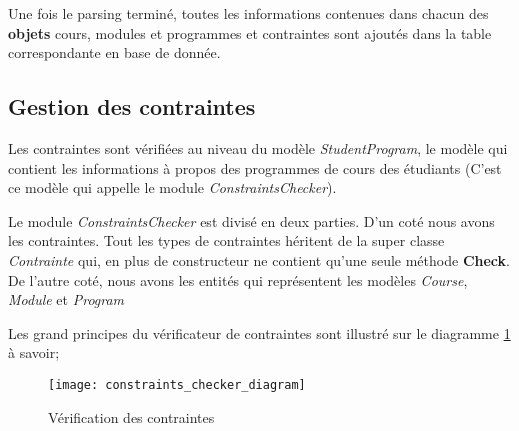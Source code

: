 

Une fois le parsing terminé, toutes les informations contenues dans chacun des \textbf{objets} cours, modules et programmes et contraintes sont ajoutés dans la table correspondante en base de donnée. 


\subsection{Gestion des contraintes}
\label{constraint_mgmt}
Les contraintes sont vérifiées au niveau du modèle \textit{StudentProgram}, le modèle qui contient les informations à propos des programmes de cours des étudiants (C'est ce modèle qui appelle le module \textit{ConstraintsChecker}). 

Le module \textit{ConstraintsChecker} est divisé en deux parties. D'un coté nous avons les contraintes. Tout les types de contraintes héritent de la super classe \textit{Contrainte} qui, en plus de constructeur ne contient qu'une seule méthode \textbf{Check}. De l'autre coté, nous avons les entités qui représentent les modèles \textit{Course}, \textit{Module} et \textit{Program}

Les grand principes du vérificateur de contraintes sont illustré sur le diagramme \ref{fig:constraint_checker_diagram} à savoir;

\begin{figure}
\centering
\caption{Vérification des contraintes}
\label{fig:constraint_checker_diagram}
\texttt{[image: constraints\_checker\_diagram]}
\end{figure}

